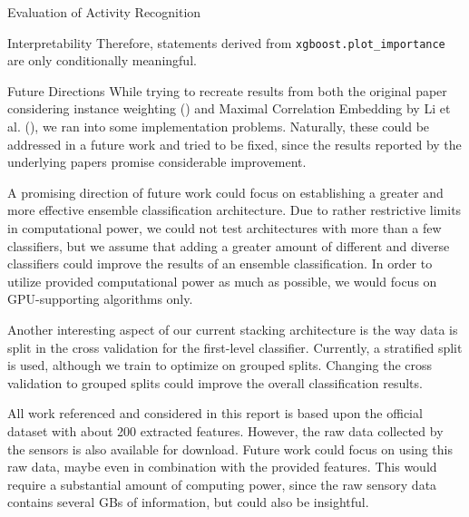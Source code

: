 \begin{section}{Evaluation of Activity Recognition}
\begin{subsection}{Interpretability}
    Therefore, statements derived from \texttt{xgboost.plot\_importance} are only conditionally meaningful.

\end{subsection}	
	
	\begin{subsection}{Future Directions}
		While trying to recreate results from both the original paper considering instance weighting (\cite{Vaizman18}) and Maximal Correlation Embedding by Li et al. (\cite{Li19}), we ran into some implementation problems. Naturally, these could be addressed in a future work and tried to be fixed, since the results reported by the underlying papers promise considerable improvement. \par
		A promising direction of future work could focus on establishing a greater and more effective ensemble classification architecture. Due to rather restrictive limits in computational power, we could not test architectures with more than a few classifiers, but we assume that adding a greater amount of different and diverse classifiers could improve the results of an ensemble classification. In order to utilize provided computational power as much as possible, we would focus on GPU-supporting algorithms only. \par
		Another interesting aspect of our current stacking architecture is the way data is split in the cross validation for the first-level classifier. Currently, a stratified split is used, although we train to optimize on grouped splits. Changing the cross validation to grouped splits could improve the overall classification results. \par
		All work referenced and considered in this report is based upon the official dataset with about 200 extracted features. However, the raw data collected by the sensors is also available for download. Future work could focus on using this raw data, maybe even in combination with the provided features. This would require a substantial amount of computing power, since the raw sensory data contains several GBs of information, but could also be insightful.
		
	\end{subsection}
\end{section}

